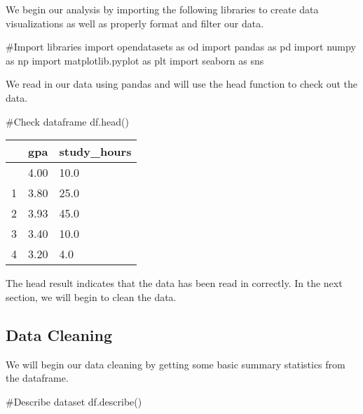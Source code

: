 \documentclass[
  letterpaper,
  DIV=11,
  numbers=noendperiod]{scrreprt}
\newenvironment{Shaded}{\begin{snugshade}}{\end{snugshade}}
\newcommand{\CommentTok}[1]{\textcolor[rgb]{0.37,0.37,0.37}{#1}}
\newcommand{\ImportTok}[1]{\textcolor[rgb]{0.00,0.46,0.62}{#1}}
\newcommand{\NormalTok}[1]{\textcolor[rgb]{0.00,0.23,0.31}{#1}}
\begin{document}
We begin our analysis by importing the following libraries to create
data visualizations as well as properly format and filter our data.

\begin{Shaded}
\begin{Highlighting}[]
\CommentTok{\#Import libraries}
\ImportTok{import}\NormalTok{ opendatasets }\ImportTok{as}\NormalTok{ od}
\ImportTok{import}\NormalTok{ pandas }\ImportTok{as}\NormalTok{ pd}
\ImportTok{import}\NormalTok{ numpy }\ImportTok{as}\NormalTok{ np}
\ImportTok{import}\NormalTok{ matplotlib.pyplot }\ImportTok{as}\NormalTok{ plt}
\ImportTok{import}\NormalTok{ seaborn }\ImportTok{as}\NormalTok{ sns}
\end{Highlighting}
\end{Shaded}

We read in our data using pandas and will use the head function to check
out the data.

\begin{Shaded}
\begin{Highlighting}[]
\CommentTok{\#Check dataframe}
\NormalTok{df.head()}
\end{Highlighting}
\end{Shaded}

\begin{longtable}[]{@{}lll@{}}
\toprule\noalign{}
& gpa & study\_hours \\
\midrule\noalign{}
\endhead
\bottomrule\noalign{}
\endlastfoot
0 & 4.00 & 10.0 \\
1 & 3.80 & 25.0 \\
2 & 3.93 & 45.0 \\
3 & 3.40 & 10.0 \\
4 & 3.20 & 4.0 \\
\end{longtable}

The head result indicates that the data has been read in correctly. In
the next section, we will begin to clean the data.

\hypertarget{data-cleaning}{%
\subsection{Data Cleaning}\label{data-cleaning}}

We will begin our data cleaning by getting some basic summary statistics
from the dataframe.

\begin{Shaded}
\begin{Highlighting}[]
\CommentTok{\#Describe dataset}
\NormalTok{df.describe()}
\end{Highlighting}
\end{Shaded}
\end{document}
